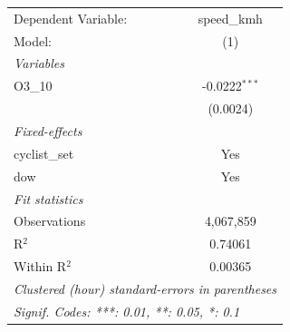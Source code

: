 \begingroup
\centering
\begin{tabular}{lc}
   \tabularnewline \midrule \midrule
   Dependent Variable: & speed\_kmh\\   
   Model:              & (1)\\  
   \midrule
   \emph{Variables}\\
   O3\_10              & -0.0222$^{***}$\\   
                       & (0.0024)\\   
   \midrule
   \emph{Fixed-effects}\\
   cyclist\_set        & Yes\\  
   dow                 & Yes\\  
   \midrule
   \emph{Fit statistics}\\
   Observations        & 4,067,859\\  
   R$^2$               & 0.74061\\  
   Within R$^2$        & 0.00365\\  
   \midrule \midrule
   \multicolumn{2}{l}{\emph{Clustered (hour) standard-errors in parentheses}}\\
   \multicolumn{2}{l}{\emph{Signif. Codes: ***: 0.01, **: 0.05, *: 0.1}}\\
\end{tabular}
\par\endgroup
